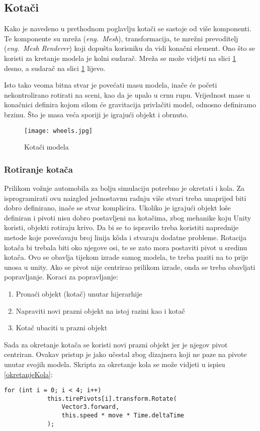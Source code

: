 \subsection{Kotači}
Kako je navedeno u prethodnom poglavlju kotači se sastoje od više komponenti. Te komponente su mreža (\emph{eng.~Mesh}), transformacija, te mrežni prevoditelj  (\emph{eng.~Mesh Renderer}) koji dopušta korisniku da vidi konačni element. Ono što se koristi za kretanje modela je kolni sudarač. Mreža se može vidjeti na slici \ref{fig:kotaci} desno, a sudarač na slici \ref{fig:kotaci} lijevo.

Isto tako veoma bitna stvar je povećati masu modela, inače će početi nekontrolirano rotirati na sceni, kao da je upalo u crnu rupu. Vrijednost mase u konačnici definira kojom silom će gravitacija privlačiti model, odnosno definiramo brzinu. Što je masa veća sporiji je igrajući objekt i obrnuto.

\begin{figure}[h]
	\texttt{[image: wheels.jpg]}
	\centering
	\caption{Kotači modela}
	\label{fig:kotaci}
\end{figure}

\subsubsection{Rotiranje kotača}
Prilikom vožnje automobila za bolju simulaciju potrebno je okretati i kola. Za isprogramirati ovu naizgled jednostavnu radnju više stvari treba unaprijed biti dobro definirano, inače se stvar komplicira. Ukoliko je igrajući objekt loše definiran i pivoti nisu dobro postavljeni na kotačima, zbog mehanike koju Unity koristi, objekti rotiraju krivo. Da bi se to ispravilo treba koristiti naprednije metode koje povećavaju broj linija k\^oda i stvaraju dodatne probleme. 
\newpage
Rotacija kotača bi trebala biti oko njegove osi, te se zato mora postaviti pivot u sredinu kotača. Ovo se obavlja tijekom izrade samog modela, te treba paziti na to prije unosa u unity. Ako se pivot nije centrirao prilikom izrade, onda se treba obavljati popravljanje. Koraci za popravljanje:

\begin{enumerate}
	\item Pronaći objekt (kotač) unutar hijerarhije
	\item Napraviti novi prazni objekt na istoj razini kao i kotač
	\item Kotač ubaciti u prazni objekt
\end{enumerate}
Sada za okretanje kotača se koristi novi prazni objekt jer je njegov pivot centriran. Ovakav pristup je jako učestal zbog dizajnera koji ne paze na pivote unutar svojih modela. Skripta za okretanje kola se može vidjeti u ispisu \ref{okretanjeKola}:
\begin{lstlisting}[caption={Skripta za okretanje kola}, label=okretanjeKola]
for (int i = 0; i < 4; i++) 
			this.tirePivots[i].transform.Rotate(
			    Vector3.forward, 
			    this.speed * move * Time.deltaTime
			);	
\end{lstlisting}

